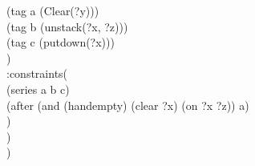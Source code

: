 \begin{appendix}
\hspace*{2.5cm}        (tag a (Clear(?y)))\\
\hspace*{2.5cm}        (tag b (unstack(?x, ?z)))\\
\hspace*{2.5cm}        (tag c (putdown(?x)))\\
\hspace*{2cm}  )\\
\hspace*{2cm}  :constraints(\\
\hspace*{2.5cm}        (series a b c)\\
\hspace*{2.5cm}        (after (and (handempty) (clear ?x) (on ?x ?z)) a)\\
\hspace*{2cm}  )\\
\hspace*{1.5cm})
\\ \hspace*{1cm})

\end{appendix}
